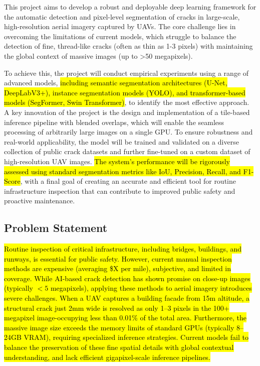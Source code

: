 \hs This project aims to develop a robust and deployable deep learning framework for the automatic detection and pixel-level segmentation of cracks in large-scale, high-resolution aerial imagery captured by UAVs. The core challenge lies in overcoming the limitations of current models, which struggle to balance the detection of fine, thread-like cracks (often as thin as 1-3 pixels) with maintaining the global context of massive images (up to >50 megapixels).

To achieve this, the project will conduct empirical experiments using a range of advanced models, \hl{including semantic segmentation architectures (U-Net, DeepLabV3+), instance segmentation models (YOLO), and transformer-based models (SegFormer, Swin Transformer)}, to identify the most effective approach. A key innovation of the project is the design and implementation of a tile-based inference pipeline with blended overlaps, which will enable the seamless processing of arbitrarily large images on a single GPU. To ensure robustness and real-world applicability, the model will be trained and validated on a diverse collection of public crack datasets and further fine-tuned on a custom dataset of high-resolution UAV images. \hl{The system's performance will be rigorously assessed using standard segmentation metrics like IoU, Precision, Recall, and F1-Score}, with a final goal of creating an accurate and efficient tool for routine infrastructure inspection that can contribute to improved public safety and proactive maintenance.

\subsection{Problem Statement}

\hs \hl{Routine inspection of critical infrastructure, including bridges, buildings, and runways, is essential for public safety. However, current manual inspection methods are expensive (averaging \$X per mile), subjective, and limited in coverage. While AI-based crack detection has shown promise on close-up images (typically $< 5$ megapixels), applying these methods to aerial imagery introduces severe challenges. When a UAV captures a building facade from 15m altitude, a structural crack just 2mm wide is resolved as only 1--3 pixels in the 100+ megapixel image-occupying less than 0.01\% of the total area. Furthermore, the massive image size exceeds the memory limits of standard GPUs (typically 8--24GB VRAM), requiring specialized inference strategies. Current models fail to balance the preservation of these fine spatial details with global contextual understanding, and lack efficient gigapixel-scale inference pipelines.}

